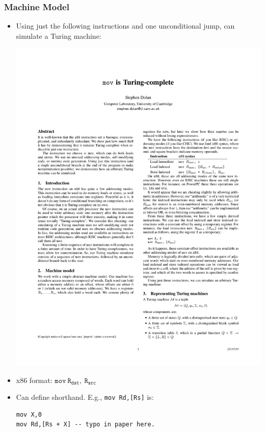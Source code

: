 \documentclass{beamer}
\begin{document}
\begin{frame}[fragile]
\frametitle{Machine Model}

\begin{itemize}
\item Using just the following instructions and one unconditional jump, can simulate a Turing machine:

\begin{center}
\includegraphics[scale=0.99]{figures/x86instructions}
\end{center}
\pause
\item x86 format: $\mathtt{mov~ R_{dst},~ R_{src}}$
\pause
\item Can define shorthand. E.g., \Verb+mov Rd,[Rs]+ is:
\begin{Verbatim}
mov X,0
mov Rd,[Rs + X] -- typo in paper here.
\end{Verbatim}

\end{itemize}
\end{frame}
\end{document}
